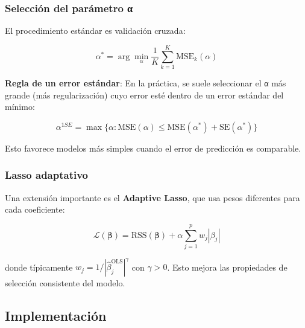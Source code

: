 \documentclass[
  doc,
  floatsintext,
  longtable,
  a4paper,
  nolmodern,
  notxfonts,
  notimes,
  12pt,
  colorlinks=true,linkcolor=blue,citecolor=blue,urlcolor=blue]{apa7}
\begin{document}
\subsubsection{Selección del parámetro
α}\label{selecciuxf3n-del-paruxe1metro-ux3b1}

El procedimiento estándar es validación cruzada:

\[
\alpha^* = \arg\min_{\alpha} \frac{1}{K} \sum_{k=1}^{K} \text{MSE}_k(\alpha)
\]

\textbf{Regla de un error estándar}: En la práctica, se suele
seleccionar el α más grande (más regularización) cuyo error esté dentro
de un error estándar del mínimo:

\[
\alpha^{1SE} = \max\{\alpha : \text{MSE}(\alpha) \leq \text{MSE}(\alpha^*) + \text{SE}(\alpha^*)\}
\]

Esto favorece modelos más simples cuando el error de predicción es
comparable.

\subsubsection{Lasso adaptativo}\label{lasso-adaptativo}

Una extensión importante es el \textbf{Adaptive Lasso}, que usa pesos
diferentes para cada coeficiente:

\[
\mathcal{L}(\boldsymbol{\beta}) = \text{RSS}(\boldsymbol{\beta}) + \alpha \sum_{j=1}^{p} w_j |\beta_j|
\]

donde típicamente \(w_j = 1/|\hat{\beta}_j^{\text{OLS}}|^{\gamma}\) con
\(\gamma > 0\). Esto mejora las propiedades de selección consistente del
modelo.

\subsection{Implementación}\label{implementaciuxf3n-2}
\end{document}

